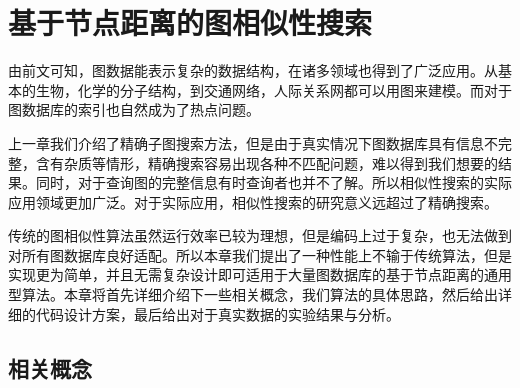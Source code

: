 \documentclass{XDBAthesis}
\begin{document}
\else
\fi
\chapter{基于节点距离的图相似性搜索}
\label{chap:gHash}
由前文可知，图数据能表示复杂的数据结构，在诸多领域也得到了广泛应用。从基本的生物，化学的分子结构，到交通网络，人际关系网都可以用图来建模。而对于图数据库的索引也自然成为了热点问题。

上一章我们介绍了精确子图搜索方法，但是由于真实情况下图数据库具有信息不完整，含有杂质等情形，精确搜索容易出现各种不匹配问题，难以得到我们想要的结果。同时，对于查询图的完整信息有时查询者也并不了解。所以相似性搜索的实际应用领域更加广泛。对于实际应用，相似性搜索的研究意义远超过了精确搜索。

传统的图相似性算法虽然运行效率已较为理想，但是编码上过于复杂，也无法做到对所有图数据库良好适配。所以本章我们提出了一种性能上不输于传统算法，但是实现更为简单，并且无需复杂设计即可适用于大量图数据库的基于节点距离的通用型算法。本章将首先详细介绍下一些相关概念，我们算法的具体思路，然后给出详细的代码设计方案，最后给出对于真实数据的实验结果与分析。
\section{相关概念}



\ifx\allfiles\undefined
%

\end{document}
